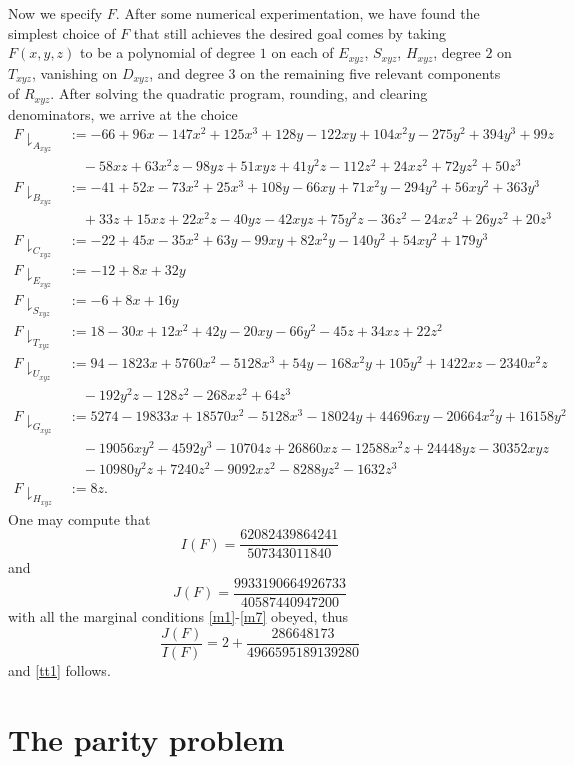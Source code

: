 \documentclass{bmcart}
\theoremstyle{plain}
\theoremstyle{definition}
\begin{document}
Now we specify $F$.  After some numerical experimentation, we have found the simplest choice of $F$ that still achieves the desired goal comes by taking $F(x,y,z)$ to be a polynomial of degree $1$ on each of $E_{xyz}$, $S_{xyz}$, $H_{xyz}$, degree $2$ on $T_{xyz}$, vanishing on $D_{xyz}$, and degree $3$ on the remaining five relevant components of $R_{xyz}$.  After solving the quadratic program, rounding, and clearing denominators, we arrive at the choice
\begin{align*}
F\downharpoonright_{A_{xyz}} &:= -66+96 x-147 x^2+125 x^3+128 y-122 x y+104 x^2 y-275 y^2+394 y^3+99 z\\
&\quad -58 x z+63 x^2 z-98 y z+51 x y z+41 y^2 z-112 z^2+24 x z^2+72 y z^2+50 z^3 \\
F\downharpoonright_{B_{xyz}} &:= -41+52 x-73 x^2+25 x^3+108 y-66 x y+71 x^2 y-294 y^2+56 x y^2+363 y^3\\
&\quad +33 z+15 x z+22 x^2 z-40 y z-42 x y z+75 y^2 z-36 z^2-24 x z^2+26 y z^2+20 z^3 \\
F\downharpoonright_{C_{xyz}} &:= -22+45 x-35 x^2+63 y-99 x y+82 x^2 y-140 y^2+54 x y^2+179 y^3 \\
F\downharpoonright_{E_{xyz}} &:= -12+8 x+32 y \\
F\downharpoonright_{S_{xyz}} &:= -6+8 x+16 y \\
F\downharpoonright_{T_{xyz}} &:= 18-30 x+12 x^2+42 y-20 x y-66 y^2-45 z+34 x z+22 z^2 \\
F\downharpoonright_{U_{xyz}} &:= 94-1823 x+5760 x^2-5128 x^3+54 y-168 x^2 y+105 y^2+1422 x z-2340 x^2 z\\
&\quad -192 y^2 z-128 z^2-268 x z^2+64 z^3 \\
F\downharpoonright_{G_{xyz}} &:= 5274-19833 x+18570 x^2-5128 x^3-18024 y+44696 x y-20664 x^2 y+16158 y^2\\
&\quad -19056 x y^2-4592 y^3-10704 z+26860 x z-12588 x^2 z+24448 y z-30352 x y z\\
&\quad -10980 y^2 z+7240 z^2-9092 x z^2-8288 y z^2-1632 z^3 \\
F\downharpoonright_{H_{xyz}} &:= 8 z.
\end{align*}
One may compute that
$$ I(F) = \frac{62082439864241}{507343011840}$$
and
$$ J(F) = \frac{9933190664926733}{40587440947200}$$
with all the marginal conditions \eqref{m1}-\eqref{m7} obeyed, thus
$$ \frac{J(F)}{I(F)} = 2 + \frac{286648173}{4966595189139280}$$
and \eqref{tt1} follows.

\section{The parity problem}\label{parity-sec}
\end{document}
